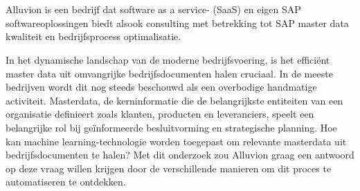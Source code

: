 
%
%
%
%
%

%



\chapter*{}
Alluvion is een bedrijf dat software as a service- (SaaS) en eigen SAP softwareoplossingen biedt alsook consulting met betrekking tot SAP master data kwaliteit en bedrijfsprocess optimalisatie.

In het dynamische landschap van de moderne bedrijfsvoering, is het efficiënt master data uit omvangrijke bedrijfsdocumenten halen cruciaal. In de meeste bedrijven wordt dit nog steeds beschouwd als een overbodige handmatige activiteit. Masterdata, de kerninformatie die de belangrijkste entiteiten van een organisatie definieert zoals klanten, producten en leveranciers, speelt een belangrijke rol bij geïnformeerde besluitvorming en strategische planning. Hoe kan machine learning-technologie worden toegepast om relevante masterdata uit bedrijfsdocumenten te halen? Met dit onderzoek zou Alluvion graag een antwoord op deze vraag willen krijgen door de verschillende manieren om dit proces te automatiseren te ontdekken.

